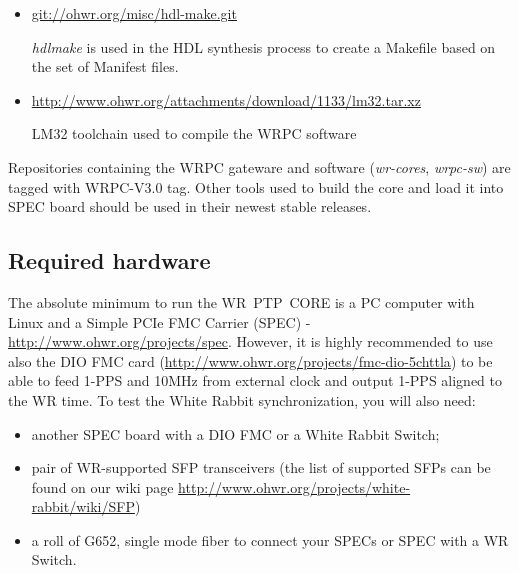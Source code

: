\documentclass[a4paper, 12pt]{article}
\newcommand{\codeHook}[1]{\mbox{\ttfamily\MakeTextUppercase{#1}}}
\begin{document}
\begin{itemize}

\item \url{git://ohwr.org/misc/hdl-make.git}

  \textit{hdlmake} is used in the HDL synthesis process to create a Makefile based
on the set of Manifest files.

\item \url{http://www.ohwr.org/attachments/download/1133/lm32.tar.xz}

  \codeHook{LM32} toolchain used to compile the \codeHook{WRPC} software

\end{itemize}
Repositories containing the \codeHook{WRPC} gateware and software (\textit{wr-cores},
\textit{wrpc-sw}) are tagged with \codeHook{wrpc-v3.0} tag. Other tools
used to build the core and load it into \codeHook{SPEC} board should be used in their
newest stable releases.


\label{Required hardware}
\subsection{Required hardware}

The absolute minimum to run the \codeHook{wr ptp core} is a PC computer with
Linux and a Simple PCIe \codeHook{fmc} Carrier
(\codeHook{spec}) - \url{http://www.ohwr.org/projects/spec}. However, it is highly
recommended to use also the \codeHook{dio} \codeHook{fmc} card (\url{http://www.ohwr.org/projects/fmc-dio-5chttla})
to be able to feed 1-PPS and 10MHz from external clock and output 1-PPS aligned
to the WR time. To test the White Rabbit synchronization, you will also need:
\begin{itemize}
\item another \codeHook{spec} board with a \codeHook{dio} \codeHook{fmc} or a White Rabbit Switch;
\item pair of \codeHook{wr}-supported \codeHook{sfp} transceivers (the list of supported
\codeHook{sfp}s can be found on our wiki page \url{http://www.ohwr.org/projects/white-rabbit/wiki/SFP})
\item a roll of G652, single mode fiber to connect your \codeHook{spec}s or \codeHook{spec}
with a \codeHook{wr} Switch.
\end{itemize}

\label{Building the Core}
\end{document}
